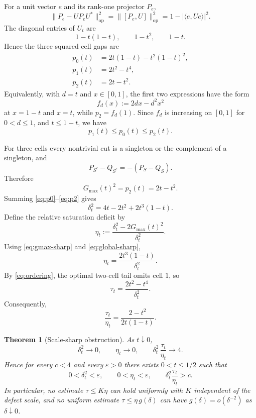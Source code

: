 \documentclass[11pt]{article}
\newtheorem{theorem}{Theorem}[section]
\newcommand{\op}{\mathrm{op}}
\newcommand{\gmax}{G_{\max}}
\newcommand{\dd}{\delta}
\begin{document}
For a unit vector $e$ and its rank-one projector $P_e$,
\begin{equation}\label{eq:rankone}
  \|P_e-UP_eU^*\|_{\op}^2
  =
  \|[P_e,U]\|_{\op}^2
  =
  1-|\langle e,Ue\rangle|^2.
\end{equation}
The diagonal entries of $U_t$ are
\[
  1-t(1-t),\qquad 1-t^2,\qquad 1-t.
\]
Hence the three squared cell gaps are
\begin{align}
  p_0(t)
  &=2t(1-t)-t^2(1-t)^2, \label{eq:p0}\\
  p_1(t)
  &=2t^2-t^4, \label{eq:p1}\\
  p_2(t)
  &=2t-t^2. \label{eq:p2}
\end{align}
Equivalently, with $d=t$ and $x\in[0,1]$, the first two expressions have
the form
\[
  f_d(x):=2dx-d^2x^2
\]
at $x=1-t$ and $x=t$, while $p_2=f_d(1)$.  Since $f_d$ is increasing on
$[0,1]$ for $0<d\le1$, and $t\le1-t$, we have
\begin{equation}\label{eq:ordering}
  p_1(t)\le p_0(t)\le p_2(t).
\end{equation}

For three cells every nontrivial cut is a singleton or the complement of a
singleton, and
\[
  P_{S^c}-Q_{S^c}=-(P_S-Q_S).
\]
Therefore
\begin{equation}\label{eq:gmax-sharp}
  \gmax(t)^2=p_2(t)=2t-t^2.
\end{equation}
Summing \eqref{eq:p0}--\eqref{eq:p2} gives
\begin{equation}\label{eq:global-sharp}
  \dd_t^2
  =
  4t-2t^2+2t^3(1-t).
\end{equation}
Define the relative saturation deficit by
\[
  \eta_t:=
  \frac{\dd_t^2-2\gmax(t)^2}{\dd_t^2}.
\]
Using \eqref{eq:gmax-sharp} and \eqref{eq:global-sharp},
\begin{equation}\label{eq:eta-sharp}
  \eta_t=
  \frac{2t^3(1-t)}{\dd_t^2}.
\end{equation}
By \eqref{eq:ordering}, the optimal two-cell tail omits cell $1$, so
\begin{equation}\label{eq:tau-sharp}
  \tau_t=
  \frac{2t^2-t^4}{\dd_t^2}.
\end{equation}
Consequently,
\begin{equation}\label{eq:ratio-sharp}
  \frac{\tau_t}{\eta_t}
  =
  \frac{2-t^2}{2t(1-t)}.
\end{equation}

\begin{theorem}[Scale-sharp obstruction]\label{thm:scale-sharp}
As $t\downarrow0$,
\begin{equation}\label{eq:scale-limit}
  \dd_t^2\longrightarrow0,
  \qquad
  \eta_t\longrightarrow0,
  \qquad
  \dd_t^2\,\frac{\tau_t}{\eta_t}\longrightarrow4.
\end{equation}
Hence for every $c<4$ and every $\varepsilon>0$ there exists
$0<t\le1/2$ such that
\[
  0<\dd_t^2<\varepsilon,
  \qquad
  0<\eta_t<\varepsilon,
  \qquad
  \dd_t^2\frac{\tau_t}{\eta_t}>c.
\]
In particular, no estimate $\tau\le K\eta$ can hold uniformly with $K$
independent of the defect scale, and no uniform estimate
$\tau\le\eta\,g(\dd)$ can have $g(\dd)=o(\dd^{-2})$ as $\dd\downarrow0$.
\end{theorem}
\end{document}
